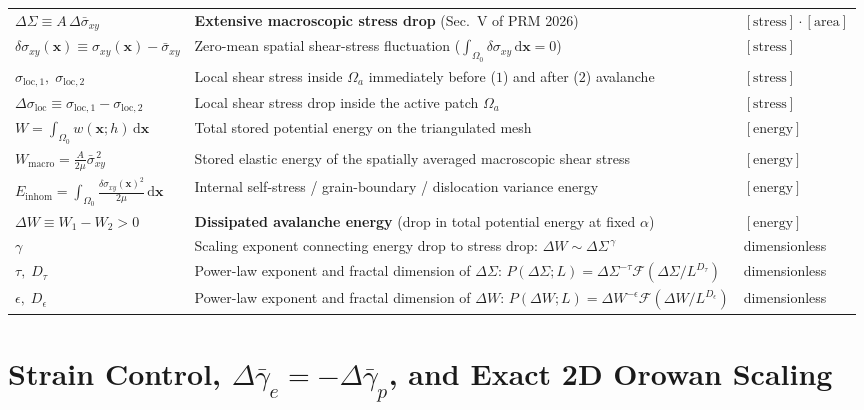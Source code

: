 \documentclass[11pt,a4paper]{article}
\newcommand{\dS}{\Delta\Sigma}
\newcommand{\dW}{\Delta W}
\newcommand{\dsigbar}{\Delta\bar{\sigma}_{xy}}
\newcommand{\sigbar}{\bar{\sigma}_{xy}}
\newcommand{\dsigloc}{\Delta\sigma_{\mathrm{loc}}}
\begin{document}
\begin{table}[ht!]
\begin{tabular}{@{}p{4.35cm}p{9.25cm}p{2.1cm}@{}}
$\dS \equiv A\,\dsigbar$ & \textbf{Extensive macroscopic stress drop} (Sec.~V of PRM 2026) & $[\text{stress}]\cdot[\text{area}]$ \\
$\delta\sigma_{xy}(\mathbf{x}) \equiv \sigma_{xy}(\mathbf{x})-\sigbar$ & Zero-mean spatial shear-stress fluctuation ($\int_{\Omega_0}\delta\sigma_{xy}\,\mathrm{d}\mathbf{x}=0$) & $[\text{stress}]$ \\
$\sigma_{\mathrm{loc},1},\; \sigma_{\mathrm{loc},2}$ & Local shear stress inside $\Omega_a$ immediately before ($1$) and after ($2$) avalanche & $[\text{stress}]$ \\
$\dsigloc \equiv \sigma_{\mathrm{loc},1}-\sigma_{\mathrm{loc},2}$ & Local shear stress drop inside the active patch $\Omega_a$ & $[\text{stress}]$ \\
\midrule
$W = \int_{\Omega_0} w(\mathbf{x};h)\,\mathrm{d}\mathbf{x}$ & Total stored potential energy on the triangulated mesh & $[\text{energy}]$ \\
$W_{\mathrm{macro}} = \frac{A}{2\mu}\sigbar^{\,2}$ & Stored elastic energy of the spatially averaged macroscopic shear stress & $[\text{energy}]$ \\
$E_{\mathrm{inhom}} = \int_{\Omega_0}\frac{\delta\sigma_{xy}(\mathbf{x})^2}{2\mu}\,\mathrm{d}\mathbf{x}$ & Internal self-stress / grain-boundary / dislocation variance energy & $[\text{energy}]$ \\
$\dW \equiv W_1 - W_2 > 0$ & \textbf{Dissipated avalanche energy} (drop in total potential energy at fixed $\alpha$) & $[\text{energy}]$ \\
\midrule
$\gamma$ & Scaling exponent connecting energy drop to stress drop: $\dW \sim \dS^{\,\gamma}$ & dimensionless \\
$\tau,\; D_\tau$ & Power-law exponent and fractal dimension of $\dS$: $P(\dS;L)=\dS^{-\tau}\mathcal{F}(\dS/L^{D_\tau})$ & dimensionless \\
$\epsilon,\; D_\epsilon$ & Power-law exponent and fractal dimension of $\dW$: $P(\dW;L)=\dW^{-\epsilon}\mathcal{F}(\dW/L^{D_\epsilon})$ & dimensionless \\
\bottomrule
\end{tabular}
\end{table}

\section{Strain Control, \texorpdfstring{$\Delta\bar{\gamma}_e = -\Delta\bar{\gamma}_p$}{Delta gamma\_e = -Delta gamma\_p}, and Exact 2D Orowan Scaling}
\label{sec:strain_control}
\end{document}
